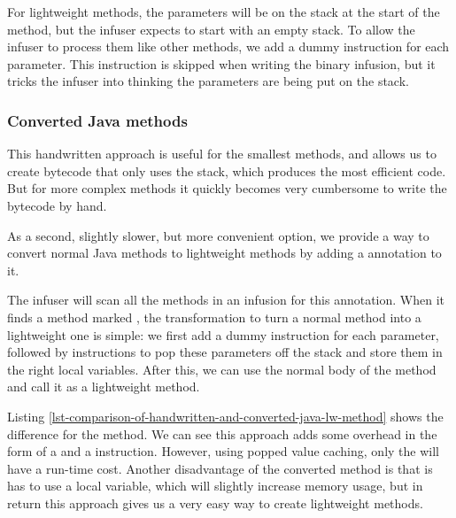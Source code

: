 For lightweight methods, the parameters will be on the stack at the start of the method, but the infuser expects to start with an empty stack. To allow the infuser to process them like other methods, we add a dummy  instruction for each parameter. This instruction is skipped when writing the binary infusion, but it tricks the infuser into thinking the parameters are being put on the stack.

\subsubsection{Converted Java methods}
This handwritten approach is useful for the smallest methods, and allows us to create bytecode that only uses the stack, which produces the most efficient code. But for more complex methods it quickly becomes very cumbersome to write the bytecode by hand.

As a second, slightly slower, but more convenient option, we provide a way to convert normal Java methods to lightweight methods by adding a  annotation to it.

The infuser will scan all the methods in an infusion for this annotation. When it finds a method marked , the transformation to turn a normal method into a lightweight one is simple: we first add a dummy  instruction for each parameter, followed by  instructions to pop these parameters off the stack and store them in the right local variables. After this, we can use the normal body of the method and call it as a lightweight method.

Listing \ref{lst-comparison-of-handwritten-and-converted-java-lw-method} shows the difference for the  method. We can see this approach adds some overhead in the form of a  and a  instruction. However, using popped value caching, only the  will have a run-time cost. Another disadvantage of the converted method is that is has to use a local variable, which will slightly increase memory usage, but in return this approach gives us a very easy way to create lightweight methods.

